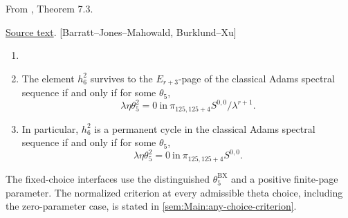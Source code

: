 \begin{theorem}
\label{paper:7.3}
From \cite{LWX126}, Theorem 7.3.\par

\href{paper/main.tex.html#L2117}{Source text}.
[Barratt--Jones--Mahowald, Burklund--Xu] \label{thm:bjmbx}
\begin{enumerate}
 \item[]
 \item    The element $h_6^2$ survives to the $E_{r+3}$-page of the classical Adams spectral sequence if and only if for some $\theta_5$, 
 $$\lambda \eta \theta_5^2 = 0 \ \text{in} \ \pi_{125,125+4} S^{0,0}/\lambda^{r+1}.$$
 \item   In particular, $h_6^2$ is a permanent cycle in the classical Adams spectral sequence if and only if for some $\theta_5$,
 $$\lambda \eta \theta_5^2 = 0 \ \text{in} \ \pi_{125,125+4} S^{0,0}.$$ 
 \end{enumerate}


\sketch
\par The fixed-choice interfaces use the distinguished $\theta_5^{\mathrm{BX}}$ and a positive finite-page parameter. The normalized criterion at every admissible theta choice, including the zero-parameter case, is stated in \ref{sem:Main:any-choice-criterion}.


\end{theorem}
